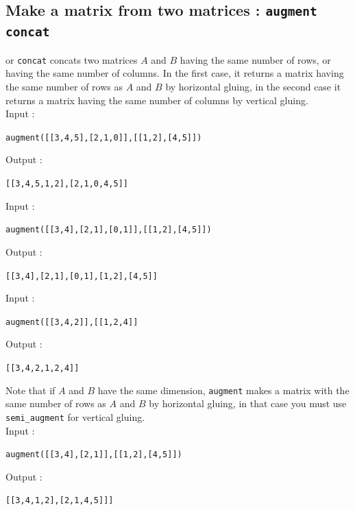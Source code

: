 \documentclass[a4paper,11pt]{book}
\begin{document}
\subsection{Make a  matrix from two matrices : {\tt augment concat}}
 or {\tt concat} concats two matrices $A$ and $B$ 
having the same number of rows, or having the same number of columns. 
In the first case, it returns a matrix having the same number of rows 
as $A$ and  $B$ by horizontal gluing, in the second case
it returns a matrix having the same number of columns by
vertical gluing.\\
Input :
\begin{center}{\tt  augment([[3,4,5],[2,1,0]],[[1,2],[4,5]])}\end{center}
Output :
\begin{center}{\tt [[3,4,5,1,2],[2,1,0,4,5]]}\end{center}
Input :
\begin{center}{\tt  augment([[3,4],[2,1],[0,1]],[[1,2],[4,5]])}\end{center}
Output :
\begin{center}{\tt [[3,4],[2,1],[0,1],[1,2],[4,5]]}\end{center}
Input :
\begin{center}{\tt augment([[3,4,2]],[[1,2,4]]}\end{center}
Output :
\begin{center}{\tt [[3,4,2,1,2,4]]}\end{center}
Note that if $A$ and $B$ have the same dimension, {\tt augment} 
makes a matrix with the same number of rows as $A$ and $B$ 
by horizontal gluing, in that case
you must use {\tt semi\_augment} for vertical gluing.\\
Input :
\begin{center}{\tt  augment([[3,4],[2,1]],[[1,2],[4,5]])}\end{center}
Output :
\begin{center}{\tt [[3,4,1,2],[2,1,4,5]]]}\end{center}
\end{document}
